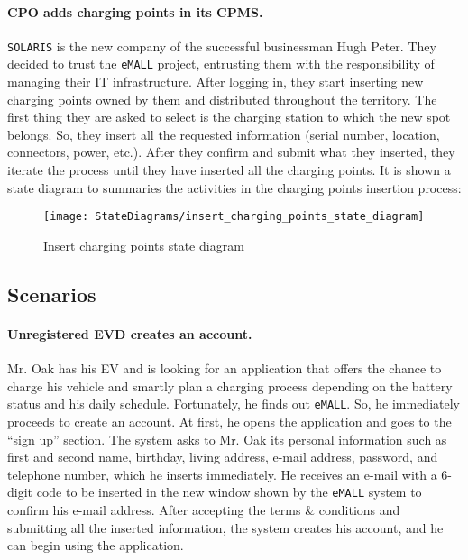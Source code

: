 \paragraph{CPO adds charging points in its CPMS.}
\verb|SOLARIS| is the new company of the successful businessman Hugh Peter.
They decided to trust the \verb|eMALL| project, entrusting them with the responsibility of managing their IT infrastructure.
After logging in, they start inserting new charging points owned by them and distributed throughout the territory.
The first thing they are asked to select is the charging station to which the new spot belongs.
So, they insert all the requested information (serial number, location, connectors, power, etc.).
After they confirm and submit what they inserted, they iterate the process until they have inserted all the charging points.
It is shown a state diagram to summaries the activities in the charging points insertion process:
\begin{figure}[H]
    \begin{center}
        \texttt{[image: StateDiagrams/insert\_charging\_points\_state\_diagram]}
        \caption{Insert charging points state diagram}
        \label{fig:insert_charging_points_sd}%
    \end{center}
\end{figure}

\subsection{Scenarios}
\label{subsec:scenarios}%

\paragraph{Unregistered EVD creates an account.}
Mr. Oak has his EV and is looking for an application that offers the chance to charge his vehicle and smartly plan a
charging process depending on the battery status and his daily schedule.
Fortunately, he finds out \verb|eMALL|\@.
So, he immediately proceeds to create an account.
At first, he opens the application and goes to the ``sign up'' section.
The system asks to Mr. Oak its personal information such as first and second name, birthday, living address, e-mail address, password, and telephone number, which he inserts immediately.
He receives an e-mail with a 6-digit code to be inserted in the new window shown by the \verb|eMALL| system to confirm his e-mail address.
After accepting the terms \& conditions and submitting all the inserted information, the system creates his account,
and he can begin using the application.

